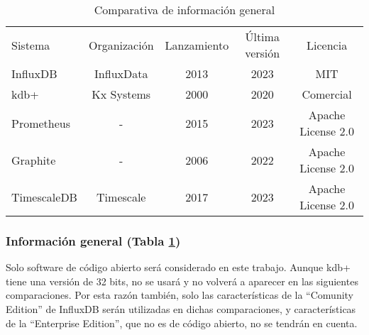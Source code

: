 \begin{table}[H]
    \begin{center}
        \begin{adjustbox}{max width=\textwidth}
            \begin{tabular}{l c c c c}
                \toprule
                Sistema & Organización & Lanzamiento & Última versión & Licencia \\
                \otoprule
                InfluxDB    & InfluxData & 2013 & 2023 & MIT \\
                kdb+        & Kx Systems & 2000 & 2020 & Comercial \\
                Prometheus  & -          & 2015 & 2023 & Apache License 2.0 \\
                Graphite    & -          & 2006 & 2022 & Apache License 2.0 \\
                TimescaleDB & Timescale  & 2017 & 2023 & Apache License 2.0 \\
                \bottomrule
            \end{tabular}
        \end{adjustbox}
        \caption{Comparativa de información general}
        \label{tabla:gisgbd}
    \end{center}
\end{table}

\subsubsection{Información general (Tabla \ref{tabla:gisgbd})} Solo software de código abierto será considerado en este
trabajo. Aunque kdb+ tiene una versión de 32 bits, no se usará y no volverá a aparecer en las siguientes comparaciones.
Por esta razón también, solo las características de la ``Comunity Edition'' de InfluxDB serán utilizadas en dichas
comparaciones, y características de la ``Enterprise Edition'', que no es de código abierto, no se tendrán en cuenta.

